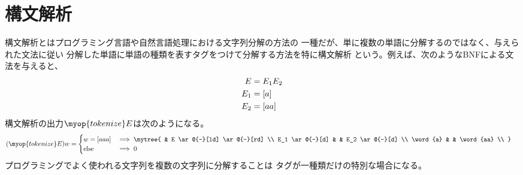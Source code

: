 \section{構文解析}\label{s1:構文解析} %
	構文解析とはプログラミング言語や自然言語処理における文字列分解の方法の
	一種だが、単に複数の単語に分解するのではなく、与えられた文法に従い
	分解した単語に単語の種類を表すタグをつけて分解する方法を特に構文解析
	という。例えば、次のようなBNFによる文法を与えると、
	\begin{equation*}\begin{split} %
		E &= E_1 E_2 \\
		E_1 &= \word{a} \\
		E_2 &= \word{aa} \\
	\end{split}\end{equation*} %
	構文解析の出力$\myop{tokenize}E$は次のようになる。
	\begin{equation*}\begin{split} %
		(\myop{tokenize}E) w &= \begin{cases}
			w=\word{aaa} &\implies \mytree {
				& E \ar@{-}[ld] \ar@{-}[rd] \\
				E_1 \ar@{-}[d] & & E_2 \ar@{-}[d] \\
				\word{a} & & \word{aa} \\
			} \\
			\text{else} &\implies 0 \\
		\end{cases}
	\end{split}\end{equation*} %
	プログラミングでよく使われる文字列を複数の文字列に分解することは
	タグが一種類だけの特別な場合になる。


